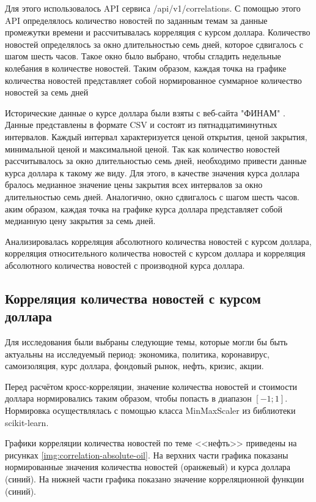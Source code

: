 Для этого использовалось API сервиса /api/v1/correlations. С помощью этого API определялось количество новостей по заданным темам за данные промежутки времени и рассчитывалась корреляция с курсом доллара. Количество новостей определялось за окно длительностью семь дней, которое сдвигалось с шагом шесть часов. Такое окно было выбрано, чтобы сгладить недельные колебания в количестве новостей. Таким образом, каждая точка на графике количества новостей представляет собой нормированное суммарное количество новостей за семь дней

Исторические данные о курсе доллара были взяты с веб-сайта "ФИНАМ" \cite{finam}. Данные представлены в формате CSV и состоят из пятнадцатиминутных интервалов. Каждый интервал характеризуется ценой открытия, ценой закрытия, минимальной ценой и максимальной ценой. Так как количество новостей рассчитывалось за окно длительностью семь дней, необходимо привести данные курса доллара к такому же виду. Для этого, в качестве значения курса доллара бралось медианное значение цены закрытия всех интервалов за окно длительностью семь дней. Аналогично, окно сдвигалось с шагом шесть часов. аким образом, каждая точка на графике курса доллара представляет собой медианную цену закрытия за семь дней.


Анализировалась корреляция абсолютного количества новостей с курсом доллара, корреляция относительного количества новостей с курсом доллара и корреляция абсолютного количества новостей с производной курса доллара.

\subsection{Корреляция количества новостей с курсом доллара}

Для исследования были выбраны следующие темы, которые могли бы быть актуальны на исследуемый период: экономика, политика, коронавирус, самоизоляция, курс доллара, фондовый рынок, нефть, кризис, акции.

Перед расчётом кросс-корреляции, значение количества новостей и стоимости доллара нормировались таким образом, чтобы попасть в диапазон $[-1; 1]$. Нормировка осуществлялась с помощью класса MinMaxScaler из библиотеки scikit-learn.

Графики корреляции количества новостей по теме <<нефть>> приведены на рисунках \ref{img:correlation-absolute-oil}. На верхних части графика показаны нормированные значения количества новостей (оранжевый) и курса доллара (синий). На нижней части графика показано значение корреляционной функции (синий).

